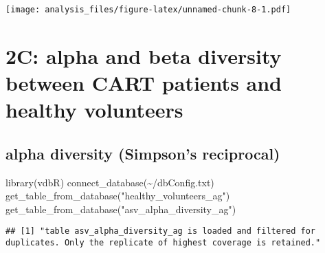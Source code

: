 \documentclass[
]{book}
\newenvironment{Shaded}{\begin{snugshade}}{\end{snugshade}}
\newcommand{\FunctionTok}[1]{\textcolor[rgb]{0.00,0.00,0.00}{#1}}
\newcommand{\NormalTok}[1]{#1}
\newcommand{\StringTok}[1]{\textcolor[rgb]{0.31,0.60,0.02}{#1}}
\begin{document}
\texttt{[image: analysis\_files/figure-latex/unnamed-chunk-8-1.pdf]}

\hypertarget{c-alpha-and-beta-diversity-between-cart-patients-and-healthy-volunteers}{%
\section{2C: alpha and beta diversity between CART patients and healthy volunteers}\label{c-alpha-and-beta-diversity-between-cart-patients-and-healthy-volunteers}}

\hypertarget{alpha-diversity-simpsons-reciprocal}{%
\subsection{alpha diversity (Simpson's reciprocal)}\label{alpha-diversity-simpsons-reciprocal}}

\begin{Shaded}
\begin{Highlighting}[]
\FunctionTok{library}\NormalTok{(vdbR)}
\FunctionTok{connect\_database}\NormalTok{(}\StringTok{\textquotesingle{}\textasciitilde{}/dbConfig.txt\textquotesingle{}}\NormalTok{)}
\FunctionTok{get\_table\_from\_database}\NormalTok{(}\StringTok{"healthy\_volunteers\_ag"}\NormalTok{)}
\FunctionTok{get\_table\_from\_database}\NormalTok{(}\StringTok{"asv\_alpha\_diversity\_ag"}\NormalTok{)}
\end{Highlighting}
\end{Shaded}

\begin{verbatim}
## [1] "table asv_alpha_diversity_ag is loaded and filtered for duplicates. Only the replicate of highest coverage is retained."
\end{verbatim}
\end{document}
